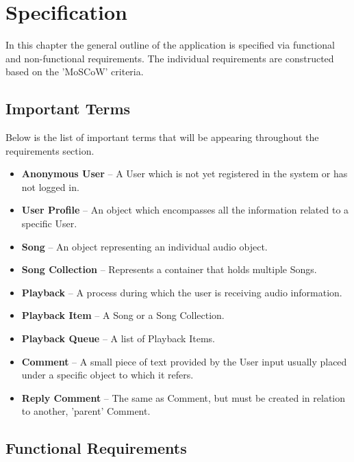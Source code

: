 \chapter{Specification}\label{chap:specification}

In this chapter the general outline of the application is specified via functional and non-functional requirements.
The individual requirements are constructed based on the 'MoSCoW' criteria\cite{moscow}.



\section{Important Terms}

Below is the list of important terms that will be appearing throughout the requirements section.

\begin{itemize}
    \item \textbf{Anonymous User} – A User which is not yet registered in the system or has not logged in.
    \item \textbf{User Profile} – An object which encompasses all the information related to a specific User.
    \item \textbf{Song} – An object representing an individual audio object.
    \item \textbf{Song Collection} – Represents a container that holds multiple Songs.
    \item \textbf{Playback} – A process during which the user is receiving audio information.
    \item \textbf{Playback Item} – A Song or a Song Collection.
    \item \textbf{Playback Queue} – A list of Playback Items.
    \item \textbf{Comment} – A small piece of text provided by the User input usually placed under a specific object to which it refers.
    \item \textbf{Reply Comment} – The same as Comment, but must be created in relation to another, 'parent' Comment.
\end{itemize}

\clearpage


\section{Functional Requirements}


